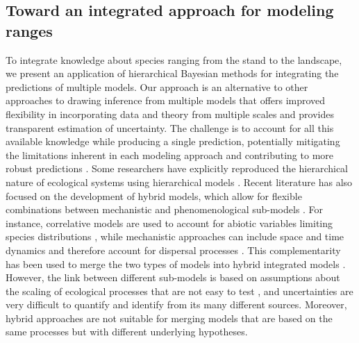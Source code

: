 \subsection*{Toward an integrated approach for modeling ranges}
To integrate knowledge about species ranging from the stand to the landscape, we present an application of hierarchical Bayesian methods for integrating the predictions of multiple models.
Our approach is an alternative to other approaches to drawing inference from multiple models that offers improved flexibility in incorporating data and theory from multiple scales and provides transparent estimation of uncertainty.
The challenge is to account for all this available knowledge while producing a single prediction, potentially mitigating the limitations inherent in each modeling approach and contributing to more robust predictions \citep{Pearson2003, Guisan2005, Araujo2006, Quillet2010}.
Some researchers have explicitly reproduced the hierarchical nature of ecological systems using hierarchical models \citep[e.g.][]{Royale2008, Catterall2012, Strigul2012, Stewart-Koster2013, Soranno2014}. 
Recent literature has also focused on the development of hybrid models, which allow for flexible combinations between mechanistic and phenomenological sub-models \citep{Gallien2010, Franklin2010, Thuiller2013}. 
For instance, correlative models are used to account for abiotic variables limiting species distributions \citep{Guisan2005}, while mechanistic approaches can include space and time dynamics and therefore account for dispersal processes \citep{Kearney2008}. 
This complementarity has been used to merge the two types of models into hybrid integrated models \citep[e.g.][]{Keith2008, Anderson2009, Smolik2010, Naujokaitis2013, Boulangeat2014}. 
However, the link between different sub-models is based on assumptions about the scaling of ecological processes that are not easy to test \citep{Gallien2010}, and uncertainties are very difficult to quantify and identify from its many different sources. 
Moreover, hybrid approaches are not suitable for merging models that are based on the same processes but with different underlying hypotheses.

